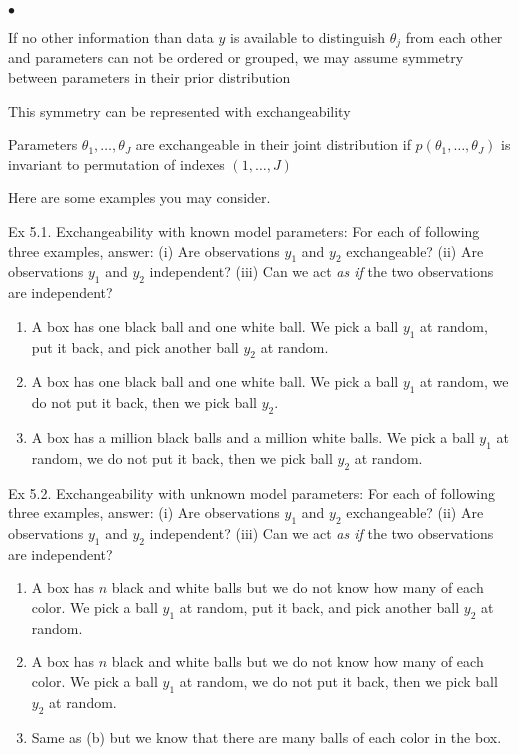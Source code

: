 \documentclass[a4paper,11pt,english]{article}
\begin{document}
\begin{list}{$\bullet$}{\itemsep=0pt\parsep=4pt\topsep=4pt}
\item If no other information than data $y$ is available to distinguish
  $\theta_j$ from each other and parameters can not be ordered or
  grouped, we may assume symmetry between parameters in their prior
  distribution
\item This symmetry can be represented with exchangeability
\item Parameters $\theta_1,\ldots,\theta_J$ are exchangeable
  in their joint distribution if $p(\theta_1,\ldots,\theta_J)$ is
  invariant to permutation of indexes  $(1,\ldots,J)$ 
\end{list}

Here are some examples you may consider. 

Ex 5.1. Exchangeability with known model parameters: For each of following three examples, answer: (i) Are observations $y_1$ and $y_2$ exchangeable? (ii) Are observations $y_1$ and $y_2$ independent? (iii) Can we act {\em as if} the two observations are independent?
\begin{enumerate}
\item A box has one black ball and one white ball.  We pick a ball $y_1$ at random, put it back, and pick another ball $y_2$ at random.
\item A box has one black ball and one white ball.   We pick a ball
  $y_1$ at random, we do not put it back, then we pick ball
   $y_2$.
\item A box has a million black balls and a million white balls.  We
  pick a ball $y_1$ at random, we do not put it back, then we pick ball
   $y_2$ at random.
\end{enumerate}

Ex 5.2. Exchangeability with unknown model parameters: For each of following
three examples, answer: (i) Are observations $y_1$ and $y_2$
exchangeable? (ii) Are observations $y_1$ and $y_2$ independent? (iii)
Can we act {\em as if} the two observations are independent?
\begin{enumerate}
\item A box has $n$ black and white balls but we do not know how many of each color.
We pick a ball $y_1$ at random, put it back, and pick another ball $y_2$ at random.
\item A box has $n$ black and white balls but we do not know how many of each color.  We pick a ball
  $y_1$ at random, we do not put it back, then we pick ball
   $y_2$ at random.
\item Same as (b) but we know that there are many balls of each color in the box.
\end{enumerate}
\end{document}
